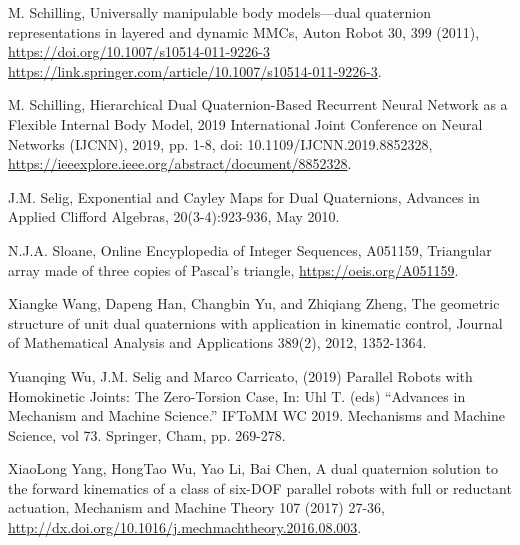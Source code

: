 \documentclass[12pt,reqno]{amsart}
\begin{document}
\begin{thebibliography}{99}
  M. Schilling, Universally manipulable body models---dual quaternion representations in layered and dynamic MMCs, Auton Robot 30, 399 (2011), \url{https://doi.org/10.1007/s10514-011-9226-3 https://link.springer.com/article/10.1007/s10514-011-9226-3}.

 M. Schilling, Hierarchical Dual Quaternion-Based Recurrent Neural Network as a Flexible Internal Body Model, 2019 International Joint Conference on Neural Networks (IJCNN), 2019, pp. 1-8, doi: 10.1109/IJCNN.2019.8852328, \url{https://ieeexplore.ieee.org/abstract/document/8852328}.

 J.M. Selig, Exponential and Cayley Maps for Dual Quaternions, Advances in Applied Clifford Algebras, 20(3-4):923-936, May 2010.

 N.J.A. Sloane, Online Encyplopedia of Integer Sequences, A051159, Triangular array made of three copies of Pascal's triangle, \url{https://oeis.org/A051159}.

 Xiangke Wang, Dapeng Han, Changbin Yu, and Zhiqiang Zheng, The geometric structure of unit dual quaternions with application in kinematic control, Journal of Mathematical Analysis and Applications 389(2), 2012, 1352-1364.

 Yuanqing Wu, J.M. Selig and Marco Carricato,  (2019) Parallel
Robots with Homokinetic Joints: The Zero-Torsion Case, In: Uhl T. (eds) ``Advances in Mechanism and Machine Science.'' IFToMM WC 2019. Mechanisms and Machine Science, vol 73. Springer, Cham, pp. 269-278.

 XiaoLong Yang, HongTao Wu, Yao Li, Bai Chen, A dual quaternion solution to the forward kinematics of a class of six-DOF parallel robots with full or reductant actuation, Mechanism and Machine Theory 107 (2017) 27-36, \url{http://dx.doi.org/10.1016/j.mechmachtheory.2016.08.003}.
\end{thebibliography}
\end{document}
